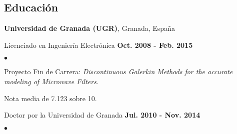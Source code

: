 \documentclass[a4paper,margin,line]{res}
\newenvironment{list2}{
  \begin{list}{$\bullet$}{%
      \setlength{\itemsep}{0in}
      \setlength{\parsep}{0in} \setlength{\parskip}{0in}
      \setlength{\topsep}{0in} \setlength{\partopsep}{0in} 
      \setlength{\leftmargin}{0.2in}}}{\end{list}}
\begin{document}
\begin{resume}
\section{\sc Educación}
{\bf Universidad de Granada (UGR)}, Granada, España\\
\vspace*{-.1in}
\begin{itemize}
  \item Licenciado en Ingeniería Electrónica \hfill {\bf Oct. 2008 - Feb. 2015}
  \begin{list2}
    \item[-] Proyecto Fin de Carrera: {\it Discontinuous Galerkin Methods for the accurate modeling of Microwave Filters}.
    \item[-] Nota media de 7.123 sobre 10.
  \end{list2}
\vspace*{.1in}
\item Doctor por la Universidad de Granada \hfill {\bf Jul. 2010 - Nov. 2014}
 \begin{list2}
  \vspace*{.05in}
  

\end{list2}
\end{itemize}
\end{resume}
\end{document}

